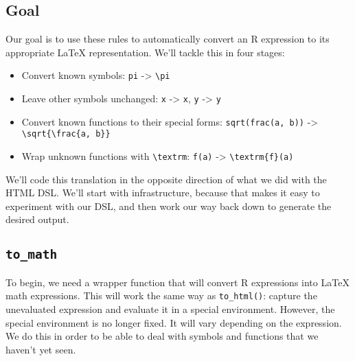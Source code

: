 \hypertarget{goal-1}{%
\subsection{Goal}\label{goal-1}}

Our goal is to use these rules to automatically convert an R expression
to its appropriate LaTeX representation. We'll tackle this in four
stages:

\begin{itemize}
\item
  Convert known symbols: \texttt{pi} -\textgreater{}
  \texttt{\textbackslash{}pi}
\item
  Leave other symbols unchanged: \texttt{x} -\textgreater{} \texttt{x},
  \texttt{y} -\textgreater{} \texttt{y}
\item
  Convert known functions to their special forms:
  \texttt{sqrt(frac(a,\ b))} -\textgreater{}
  \texttt{\textbackslash{}sqrt\{\textbackslash{}frac\{a,\ b\}\}}
\item
  Wrap unknown functions with \texttt{\textbackslash{}textrm}:
  \texttt{f(a)} -\textgreater{} \texttt{\textbackslash{}textrm\{f\}(a)}
\end{itemize}

We'll code this translation in the opposite direction of what we did
with the HTML DSL. We'll start with infrastructure, because that makes
it easy to experiment with our DSL, and then work our way back down to
generate the desired output.

\hypertarget{to_math}{%
\subsection{\texorpdfstring{\texttt{to\_math}}{to\_math}}\label{to_math}}

To begin, we need a wrapper function that will convert R expressions
into LaTeX math expressions. This will work the same way as
\texttt{to\_html()}: capture the unevaluated expression and evaluate it
in a special environment. However, the special environment is no longer
fixed. It will vary depending on the expression. We do this in order to
be able to deal with symbols and functions that we haven't yet seen.

\begin{Shaded}
\begin{Highlighting}[]
\StringTok{ }
\StringTok{ }
\NormalTok{\}}
\end{Highlighting}
\end{Shaded}

